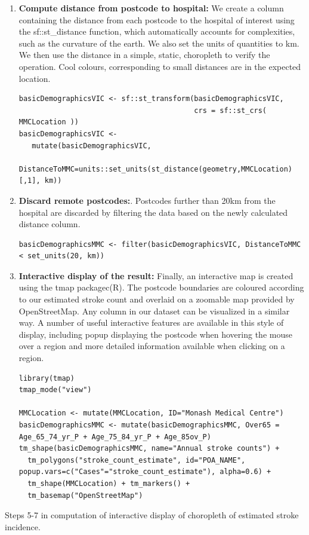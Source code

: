 \documentclass[utf8]{frontiersHLTH}
\begin{document}
\begin{table}[h]
\begin{center}
  \sffamily
  \tiny
\begin{mdframed}[backgroundcolor=blue!20]
\begin{enumerate}
  \def\labelenumi{\arabic{enumi}.}
  \setcounter{enumi}{4}
\item
  {\bf Compute distance from postcode to hospital:} We create a column
  containing the distance from each postcode to the hospital of interest
  using the sf::st\_distance function, which automatically accounts for
  complexities, such as the curvature of the earth. We also set the
  units of quantities to km. We then use the distance in a simple,
  static, choropleth to verify the operation. Cool colours,
  corresponding to small distances are in the expected location.
\begin{lstlisting}
basicDemographicsVIC <- sf::st_transform(basicDemographicsVIC, 
                                         crs = sf::st_crs( MMCLocation ))
basicDemographicsVIC <- 
   mutate(basicDemographicsVIC, 
          DistanceToMMC=units::set_units(st_distance(geometry,MMCLocation)[,1], km))
\end{lstlisting}
\item
  {\bf Discard remote postcodes:}. Postcodes further than 20km from the
  hospital are discarded by filtering the data based on the newly
  calculated distance column.
\begin{lstlisting}
basicDemographicsMMC <- filter(basicDemographicsVIC, DistanceToMMC < set_units(20, km))
\end{lstlisting}
\item
  {\bf Interactive display of the result:} Finally, an interactive map is
  created using the tmap packagec(R). The postcode boundaries are coloured
  according to our estimated stroke count and overlaid on a zoomable map
  provided by OpenStreetMap. Any column in our dataset can be visualized
  in a similar way. A number of useful interactive features are
  available in this style of display, including popup displaying the
  postcode when hovering the mouse over a region and more detailed
  information available when clicking on a region.
\begin{lstlisting}
library(tmap)
tmap_mode("view")

MMCLocation <- mutate(MMCLocation, ID="Monash Medical Centre")
basicDemographicsMMC <- mutate(basicDemographicsMMC, Over65 = Age_65_74_yr_P + Age_75_84_yr_P + Age_85ov_P)
tm_shape(basicDemographicsMMC, name="Annual stroke counts") + 
  tm_polygons("stroke_count_estimate", id="POA_NAME", popup.vars=c("Cases"="stroke_count_estimate"), alpha=0.6) + 
  tm_shape(MMCLocation) + tm_markers() + 
  tm_basemap("OpenStreetMap")
\end{lstlisting}

\end{enumerate}
\end{mdframed}
\end{center}
\caption{Steps 5-7 in computation of interactive display of choropleth of
  estimated stroke incidence. \label{tab:exampleA2}}
\end{table}
\end{document}
